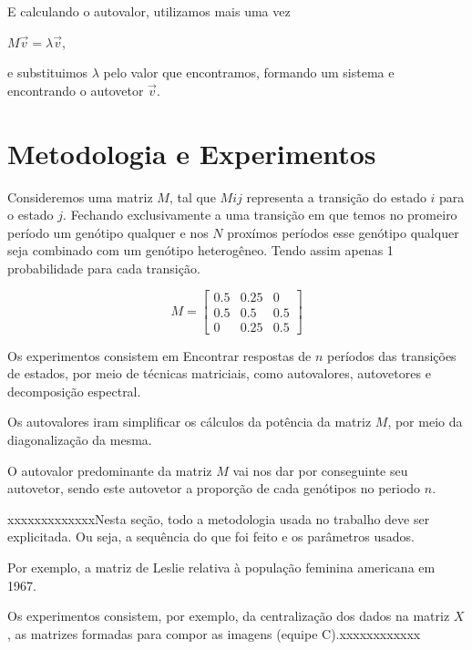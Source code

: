 \documentclass[a4paper,12pt]{article}
\begin{document}
E calculando o autovalor, utilizamos mais uma vez\\
\begin{center}
    $M \vec{v} = \lambda \vec{v}$,
\end{center}
e substituimos $\lambda$ pelo valor que encontramos, formando um sistema e encontrando o autovetor $\vec{v}$.

\section{Metodologia e Experimentos}
\label{sec:metodologia}


Consideremos uma matriz $M$, tal que $Mij$ representa a transição do estado $i$ para o estado $j$. Fechando exclusivamente a uma transição em que temos no promeiro período um genótipo qualquer e nos $N$ proxímos períodos esse genótipo qualquer seja combinado com um genótipo heterogêneo. Tendo assim apenas 1 probabilidade para cada transição. 

\begin{displaymath}
M = \begin{bmatrix}
0.5&0.25&0\\
0.5&0.5&0.5\\
0&0.25&0.5
\end{bmatrix}
\end{displaymath}

Os experimentos consistem em Encontrar respostas de $n$ períodos das transições de estados, por meio de técnicas matriciais, como autovalores, autovetores e decomposição espectral.

Os autovalores iram simplificar os cálculos da potência da matriz $M$, por meio da diagonalização da mesma. 

O autovalor predominante da matriz $M$ vai nos dar por conseguinte seu autovetor, sendo este autovetor a proporção de cada genótipos no periodo $n$.





xxxxxxxxxxxxxNesta seção, todo a metodologia usada no trabalho deve ser explicitada. Ou seja, a sequência do que foi feito e os parâmetros usados.

Por exemplo, a matriz de Leslie relativa à população feminina americana em 1967.

Os experimentos consistem, por exemplo, da centralização dos dados na matriz $X$, as matrizes formadas para compor as imagens (equipe C).xxxxxxxxxxxx
\end{document}
